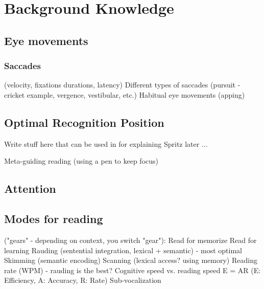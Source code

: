 \section{Background Knowledge}
\subsection{Eye movements}
\subsubsection{Saccades}
(velocity, fixations durations, latency)
Different types of saccades (pursuit - cricket example, vergence, vestibular, etc.)
Habitual eye movements (apping)
\subsection{Optimal Recognition Position} \label{ORP}
Write stuff here that can be used in for explaining Spritz later ...


Meta-guiding reading (using a pen to keep focus)
\subsection{Attention}
\subsection{Modes for reading}
("gears" - depending on context, you switch "gear"):
Read for memorize
Read for learning
Rauding (sentential integration, lexical + semantic) - most optimal
Skimming (semantic encoding)
Scanning (lexical access? using memory)
Reading rate (WPM) - rauding is the best?
Cognitive speed vs. reading speed
E = AR (E: Efficiency, A: Accuracy, R: Rate)
Sub-vocalization